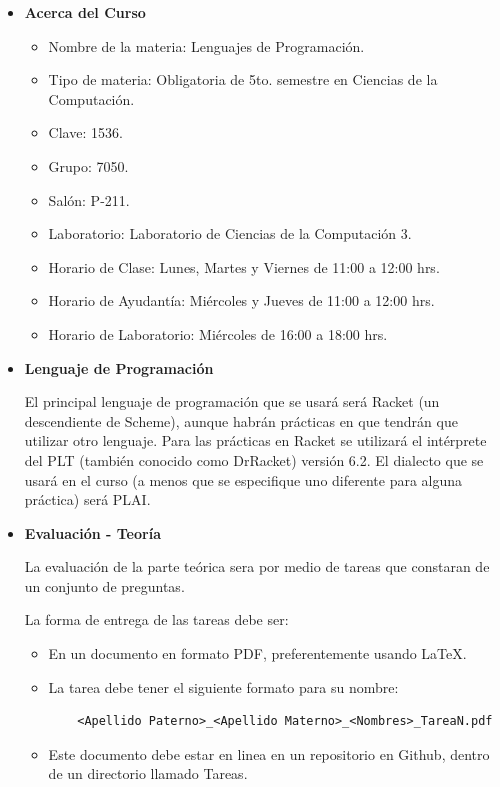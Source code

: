\documentclass[10pt]{article}
\begin{document}
\begin{itemize}
\item \textbf{Acerca del Curso}
  
  \begin{itemize}
  \item  Nombre de la materia: Lenguajes de Programación.
  \item Tipo de materia: Obligatoria de 5to. semestre en Ciencias de
    la Computación.
  \item Clave: 1536.
  \item Grupo: 7050.
  \item Salón: P-211.
  \item Laboratorio: Laboratorio de Ciencias de la Computación 3.
  \item Horario de Clase: Lunes, Martes y Viernes de 11:00 a 12:00 hrs.
  \item Horario de Ayudantía: Miércoles y Jueves de 11:00 a 12:00 hrs.
  \item Horario de Laboratorio: Miércoles de 16:00 a 18:00 hrs.
  \end{itemize}

\item \textbf{Lenguaje de Programación}

El principal lenguaje de programación que se usará será Racket (un
descendiente de Scheme), aunque habrán prácticas en que tendrán
que utilizar otro lenguaje. Para las prácticas en Racket se utilizará el
intérprete del PLT (también conocido como DrRacket) versión 6.2. El dialecto que se
usará en el curso (a menos que se especifique uno diferente para alguna práctica)
será PLAI.

\item \textbf{Evaluación - Teoría}
  
  La evaluación de la parte teórica sera por medio de tareas que constaran de un conjunto de preguntas.

  La forma de entrega de las tareas debe ser:
  \begin{itemize}
  \item En un documento en formato PDF, preferentemente usando \LaTeX.
  \item La tarea debe tener el siguiente formato para su nombre:
  \begin{verbatim}
    <Apellido Paterno>_<Apellido Materno>_<Nombres>_TareaN.pdf
  \end{verbatim}
  \item Este documento debe estar en linea en un repositorio en Github,
    dentro de un directorio llamado Tareas.
  \end{itemize}


\end{itemize}
\end{document}

